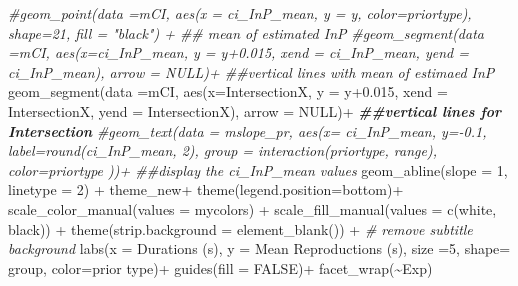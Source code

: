 \documentclass[
]{article}
\newenvironment{Shaded}{\begin{snugshade}}{\end{snugshade}}
\newcommand{\AttributeTok}[1]{\textcolor[rgb]{0.77,0.63,0.00}{#1}}
\newcommand{\CommentTok}[1]{\textcolor[rgb]{0.56,0.35,0.01}{\textit{#1}}}
\newcommand{\ConstantTok}[1]{\textcolor[rgb]{0.00,0.00,0.00}{#1}}
\newcommand{\DecValTok}[1]{\textcolor[rgb]{0.00,0.00,0.81}{#1}}
\newcommand{\DocumentationTok}[1]{\textcolor[rgb]{0.56,0.35,0.01}{\textbf{\textit{#1}}}}
\newcommand{\FloatTok}[1]{\textcolor[rgb]{0.00,0.00,0.81}{#1}}
\newcommand{\FunctionTok}[1]{\textcolor[rgb]{0.00,0.00,0.00}{#1}}
\newcommand{\NormalTok}[1]{#1}
\newcommand{\SpecialCharTok}[1]{\textcolor[rgb]{0.00,0.00,0.00}{#1}}
\newcommand{\StringTok}[1]{\textcolor[rgb]{0.31,0.60,0.02}{#1}}
\begin{document}
\begin{Shaded}
\begin{Highlighting}[]
    \CommentTok{\#geom\_point(data =mCI, aes(x = ci\_InP\_mean, y = y, color=priortype), shape=21, fill = "black") + \#\# mean of estimated InP}
  \CommentTok{\#geom\_segment(data =mCI, aes(x=ci\_InP\_mean, y = y+0.015, xend = ci\_InP\_mean, yend = ci\_InP\_mean), arrow = NULL)+ \#\#vertical lines with mean of estimaed InP}
  \FunctionTok{geom\_segment}\NormalTok{(}\AttributeTok{data =}\NormalTok{mCI, }\FunctionTok{aes}\NormalTok{(}\AttributeTok{x=}\NormalTok{IntersectionX, }\AttributeTok{y =}\NormalTok{ y}\FloatTok{+0.015}\NormalTok{, }\AttributeTok{xend =}\NormalTok{ IntersectionX, }\AttributeTok{yend =}\NormalTok{ IntersectionX), }\AttributeTok{arrow =} \ConstantTok{NULL}\NormalTok{)}\SpecialCharTok{+} \DocumentationTok{\#\#vertical lines for Intersection}
  \CommentTok{\#geom\_text(data = mslope\_pr, aes(x= ci\_InP\_mean, y={-}0.1, label=round(ci\_InP\_mean, 2), group = interaction(priortype, range), color=priortype ))+  \#\#display the ci\_InP\_mean values }
  \FunctionTok{geom\_abline}\NormalTok{(}\AttributeTok{slope =} \DecValTok{1}\NormalTok{, }\AttributeTok{linetype =} \DecValTok{2}\NormalTok{) }\SpecialCharTok{+}
\NormalTok{  theme\_new}\SpecialCharTok{+} \FunctionTok{theme}\NormalTok{(}\AttributeTok{legend.position=}\StringTok{\textquotesingle{}bottom\textquotesingle{}}\NormalTok{)}\SpecialCharTok{+} 
  \FunctionTok{scale\_color\_manual}\NormalTok{(}\AttributeTok{values =}\NormalTok{ mycolors) }\SpecialCharTok{+}
  \FunctionTok{scale\_fill\_manual}\NormalTok{(}\AttributeTok{values =} \FunctionTok{c}\NormalTok{(}\StringTok{\textquotesingle{}white\textquotesingle{}}\NormalTok{, }\StringTok{\textquotesingle{}black\textquotesingle{}}\NormalTok{)) }\SpecialCharTok{+}
  \FunctionTok{theme}\NormalTok{(}\AttributeTok{strip.background =} \FunctionTok{element\_blank}\NormalTok{()) }\SpecialCharTok{+} \CommentTok{\# remove subtitle background}
  \FunctionTok{labs}\NormalTok{(}\AttributeTok{x =} \StringTok{\textquotesingle{}Durations (s)\textquotesingle{}}\NormalTok{, }\AttributeTok{y =} \StringTok{\textquotesingle{}Mean Reproductions (s)\textquotesingle{}}\NormalTok{, }\AttributeTok{size =}\DecValTok{5}\NormalTok{, }\AttributeTok{shape=} \StringTok{\textquotesingle{}group\textquotesingle{}}\NormalTok{, }\AttributeTok{color=}\StringTok{\textquotesingle{}prior type\textquotesingle{}}\NormalTok{)}\SpecialCharTok{+} \FunctionTok{guides}\NormalTok{(}\AttributeTok{fill =} \ConstantTok{FALSE}\NormalTok{)}\SpecialCharTok{+}
  \FunctionTok{facet\_wrap}\NormalTok{(}\SpecialCharTok{\textasciitilde{}}\NormalTok{Exp)}
\end{Highlighting}
\end{Shaded}
\end{document}
